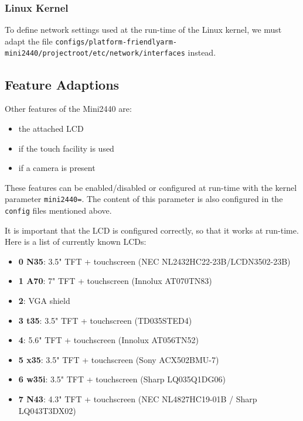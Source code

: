 \subsubsection{Linux Kernel}			\label{sec:linuxnetwork}

To define network settings used at the run-time of the Linux kernel, we must
adapt the file
\texttt{configs/platform-friendlyarm-mini2440/projectroot/etc/network/interfaces}
instead.

\subsection{Feature Adaptions}		\label{sec:featureadaptions}

Other features of the Mini2440 are:

\begin{itemize}
 \item the attached LCD
 \item if the touch facility is used
 \item if a camera is present
\end{itemize}

These features can be enabled/disabled or configured at run-time with the kernel
parameter \texttt{mini2440=}. The content of this parameter is also configured
in the \texttt{config} files mentioned above.

It is important that the LCD is configured correctly, so that it works at
run-time. Here is a list of currently known LCDs:

\begin{itemize}
 \item \textbf{0 N35}: 3.5" TFT + touchscreen (NEC NL2432HC22-23B/LCDN3502-23B)
 \item \textbf{1 A70}: 7" TFT + touchscreen (Innolux AT070TN83)
 \item \textbf{2}: VGA shield
 \item \textbf{3 t35}: 3.5" TFT + touchscreen (TD035STED4)
 \item \textbf{4}: 5.6" TFT + touchscreen (Innolux AT056TN52)
 \item \textbf{5 x35}: 3.5" TFT + touchscreen (Sony ACX502BMU-7)
 \item \textbf{6 w35i}: 3.5" TFT + touchscreen (Sharp LQ035Q1DG06)
 \item \textbf{7 N43}: 4.3" TFT + touchscreen (NEC NL4827HC19-01B / Sharp LQ043T3DX02)
%
%
\end{itemize}

